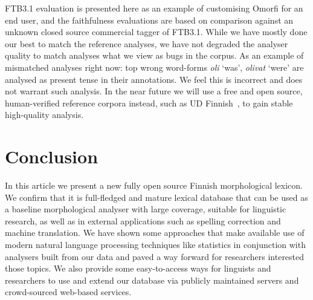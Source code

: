 \documentclass[a4paper,12pt]{article}
\newif\iffinal
\begin{document}
FTB3.1 evaluation is presented here as an example of customising Omorfi for an
end user, and the faithfulness evaluations are based on comparison against an
unknown closed source commercial tagger of FTB3.1. While we have mostly done
our best to match the reference analyses, we have not degraded the analyser
quality to match analyses what we view as bugs in the corpus. As an example of
mismatched analyses right now: top wrong word-forms \textit{oli} `was',
\textit{olivat} `were' are analysed as present tense in their annotations. We
feel this is incorrect and does not warrant such analysis. In the near future
we will use a free and open source, human-verified reference corpora instead,
such as UD Finnish~\citep{pyysalo2015universal}, to gain stable high-quality
analysis.


\section{Conclusion}
\label{sec:conclusion}

In this article we present a new fully open source Finnish
morphological lexicon. We confirm that it is full-fledged and mature lexical
database that can be used as a baseline morphological analyser with large
coverage, suitable for linguistic research, as well as in external applications
such as spelling correction and machine translation. We have shown
some approaches that make available use of modern natural language processing
techniques like statistics in conjunction with analysers built from our data
and paved a way forward for researchers interested those topics. We also
provide some easy-to-access ways for linguists and researchers to use and
extend our database via publicly maintained servers and crowd-sourced web-based
services.



\iffinal
\newpage
\begin{small}
    \noindent Contact Information:\\
\\
    Tommi A Pirinen\\
    Ollscoil Chathair Bhaile Átha Cliath\\
    IE-D09 W6Y4\\
    Éire\\
    e-mail: \url{Tommi.Pirinen@computing.dcu.ie}\\
\end{small}
\fi
\end{document}
